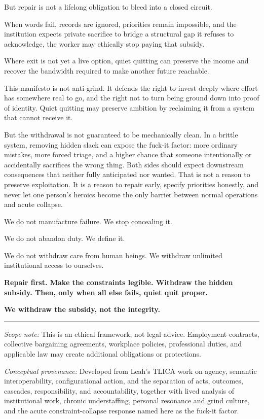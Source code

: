 \documentclass[11pt,oneside]{article}
\begin{document}
But repair is not a lifelong obligation to bleed into a closed circuit.

When words fail, records are ignored, priorities remain impossible, and
the institution expects private sacrifice to bridge a structural gap it
refuses to acknowledge, the worker may ethically stop paying that
subsidy.

Where exit is not yet a live option, quiet quitting can preserve the
income and recover the bandwidth required to make another future
reachable.

This manifesto is not anti-grind. It defends the right to invest deeply
where effort has somewhere real to go, and the right not to turn being
ground down into proof of identity. Quiet quitting may preserve ambition
by reclaiming it from a system that cannot receive it.

But the withdrawal is not guaranteed to be mechanically clean. In a
brittle system, removing hidden slack can expose the fuck-it factor:
more ordinary mistakes, more forced triage, and a higher chance that
someone intentionally or accidentally sacrifices the wrong thing. Both
sides should expect downstream consequences that neither fully
anticipated nor wanted. That is not a reason to preserve exploitation.
It is a reason to repair early, specify priorities honestly, and never
let one person's heroics become the only barrier between normal
operations and acute collapse.

We do not manufacture failure. We stop concealing it.

We do not abandon duty. We define it.

We do not withdraw care from human beings. We withdraw unlimited
institutional access to ourselves.

\textbf{Repair first. Make the constraints legible. Withdraw the hidden
subsidy. Then, only when all else fails, quiet quit proper.}

\textbf{We withdraw the subsidy, not the integrity.}

\begin{center}\rule{0.5\linewidth}{0.5pt}\end{center}

\emph{Scope note:} This is an ethical framework, not legal advice.
Employment contracts, collective bargaining agreements, workplace
policies, professional duties, and applicable law may create additional
obligations or protections.

\emph{Conceptual provenance:} Developed from Leah's TLICA work on
agency, semantic interoperability, configurational action, and the
separation of acts, outcomes, cascades, responsibility, and
accountability, together with lived analysis of institutional work,
chronic understaffing, personal resonance and grind culture, and the
acute constraint-collapse response named here as the fuck-it factor.
\end{document}
